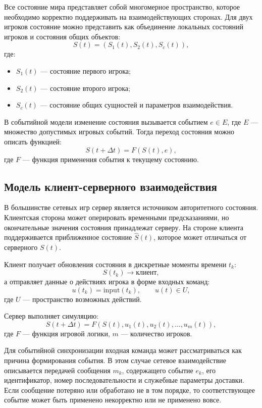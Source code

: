 Все состояние мира представляет собой многомерное пространство, которое необходимо корректно поддерживать на взаимодействующих сторонах. Для двух игроков состояние можно представить как объединение локальных состояний игроков и состояния общих объектов:
\[
	S(t) = \left(S_1(t), S_2(t), S_c(t)\right),
\]
где:
\begin{itemize}
	\item $S_1(t)$ --- состояние первого игрока;
	\item $S_2(t)$ --- состояние второго игрока;
	\item $S_c(t)$ --- состояние общих сущностей и параметров взаимодействия.
\end{itemize}

В событийной модели изменение состояния вызывается событием $e \in E$, где $E$ --- множество допустимых игровых событий. Тогда переход состояния можно описать функцией:
\[
	S(t + \Delta t) = F(S(t), e),
\]
где $F$ --- функция применения события к текущему состоянию.

\subsection{Модель клиент-серверного взаимодействия}

В большинстве сетевых игр сервер является источником авторитетного состояния. Клиентская сторона может оперировать временными предсказаниями, но окончательные значения состояния принадлежат серверу. На стороне клиента поддерживается приближенное состояние $\hat{S}(t)$, которое может отличаться от серверного $S(t)$.

Клиент получает обновления состояния в дискретные моменты времени $t_k$:
\[
	S(t_k) \rightarrow \text{клиент},
\]
а отправляет данные о действиях игрока в форме входных команд:
\[
	u(t_k) = \text{input}(t_k), \qquad u(t) \in U,
\]
где $U$ --- пространство возможных действий.

Сервер выполняет симуляцию:
\[
	S(t + \Delta t) = F(S(t), u_1(t), u_2(t), \ldots, u_m(t)),
\]
где $F$ --- функция игровой логики, $m$ --- количество игроков.

Для событийной синхронизации входная команда может рассматриваться как причина формирования события. В этом случае сетевое взаимодействие описывается передачей сообщения $m_k$, содержащего событие $e_k$, его идентификатор, номер последовательности и служебные параметры доставки. Если сообщение потеряно или обработано не в том порядке, то соответствующее событие может быть применено некорректно или не применено вовсе.

